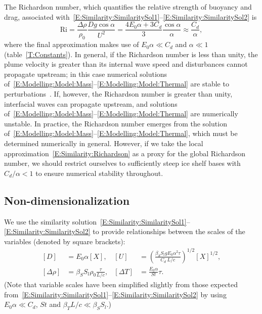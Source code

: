 \documentclass[openacc]{rsproca_new}%
\begin{document}
The Richardson number, which quantifies the relative strength of buoyancy and drag, associated with~\eqref{E:Similarity:SimilaritySol1}--\eqref{E:Similarity:SimilaritySol2} is
\begin{equation}\label{E:Similarity:Richardson}
\mathrm{Ri} = \frac{\Delta \rho}{\rho_0}\frac{D g \cos \alpha}{U^2} = \frac{4E_0 \alpha + 3C_d}{3} \frac{\cos \alpha}{\alpha} \approx \frac{C_d}{\alpha},
\end{equation}
where the final approximation makes use of $E_0 \alpha \ll C_d$ and $\alpha \ll 1$ (table~\ref{T:Constants}). In general, if the Richardson number is less than unity, the plume velocity is greater than its internal wave speed and disturbances cannot propagate upstream; in this case numerical solutions of~\eqref{E:Modelling:Model:Mass}--\eqref{E:Modelling:Model:Thermal} are stable to perturbations~\citep{Jenkinsphdthesis}. If, however, the Richardson number is greater than unity, interfacial waves can propagate upstream, and solutions of~\eqref{E:Modelling:Model:Mass}--\eqref{E:Modelling:Model:Thermal} are numerically unstable. In practice, the Richardson number emerges from the solution of~\eqref{E:Modelling:Model:Mass}--\eqref{E:Modelling:Model:Thermal}, which must be determined numerically in general. However, if we take the local approximation~\eqref{E:Similarity:Richardson} as a proxy for the global Richardson number, we should restrict ourselves to sufficiently steep ice shelf bases with $C_d/\alpha < 1$ to ensure numerical stability throughout.

\subsection{Non-dimensionalization}\label{S:Model:NonDim}
We use the similarity solution~\eqref{E:Similarity:SimilaritySol1}--\eqref{E:Similarity:SimilaritySol2} to provide relationships between the scales of the variables (denoted by square brackets):
\begin{align}
\left[D\right] &= E_0 \alpha \left[X\right], & \left[U\right] &= \left(\frac{\beta_S S_l g E_0 \alpha^2 \tau}{C_d ~L/c}\right)^{1/2}[X]^{1/2},\label{E:Similarity:Scales1}\\
\left[\Delta \rho\right] &= \beta_S S_l \rho_0 \frac{\tau}{L/c}, & \left[\Delta T\right] &= \frac{E_0 \alpha}{St}\tau.\label{E:Similarity:Scales2}
\end{align}
(Note that variable scales have been simplified slightly from those expected from~\eqref{E:Similarity:SimilaritySol1}--\eqref{E:Similarity:SimilaritySol2} by using $E_0 \alpha \ll C_d$, $St$ and $\beta_T L /c \ll \beta_S S_l$.)
\end{document}
